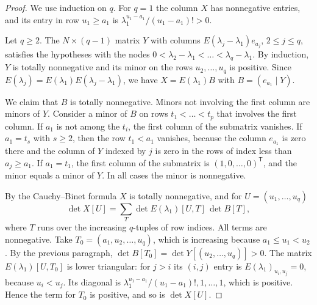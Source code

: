 \documentclass{amsart}
\theoremstyle{definition}
\numberwithin{equation}{section}
\begin{document}
\begin{proof}
We use induction on $q$. For $q=1$ the column $X$ has nonnegative entries, and
its entry in row $u_1\ge a_1$ is $\lambda_1^{u_1-a_1}/(u_1-a_1)!>0$.

Let $q\ge2$. The $N\times(q-1)$ matrix $Y$ with columns
$E(\lambda_j-\lambda_1)e_{a_j}$, $2\le j\le q$, satisfies the hypotheses with
the nodes $0<\lambda_2-\lambda_1<\dots<\lambda_q-\lambda_1$. By induction, $Y$
is totally nonnegative and its minor on the rows $u_2,\dots,u_q$ is positive.
Since $E(\lambda_j)=E(\lambda_1)E(\lambda_j-\lambda_1)$, we have $X=E(\lambda_1)B$
with $B=(e_{a_1}\mid Y)$.

We claim that $B$ is totally nonnegative. Minors not involving the first
column are minors of $Y$. Consider a minor of $B$ on rows $t_1<\dots<t_p$ that
involves the first column. If $a_1$ is not among the $t_i$, the first column of
the submatrix vanishes. If $a_1=t_s$ with $s\ge2$, then the row $t_1<a_1$
vanishes, because the column $e_{a_1}$ is zero there and the column of $Y$
indexed by $j$ is zero in the rows of index less than $a_j\ge a_1$. If $a_1=t_1$, the first column of the
submatrix is $(1,0,\dots,0)^{\mathsf T}$, and the minor equals a minor of $Y$.
In all cases the minor is nonnegative.

By the Cauchy--Binet formula $X$ is totally nonnegative, and for
$U=(u_1,\dots,u_q)$
\[
  \det X[U]=\sum_{T}\det E(\lambda_1)[U,T]\,\det B[T],
\]
where $T$ runs over the increasing $q$-tuples of row indices. All terms are
nonnegative. Take $T_0=(a_1,u_2,\dots,u_q)$, which is increasing because
$a_1\le u_1<u_2$. By the previous paragraph,
$\det B[T_0]=\det Y[(u_2,\dots,u_q)]>0$. The matrix $E(\lambda_1)[U,T_0]$ is
lower triangular: for $j>i$ its $(i,j)$ entry is $E(\lambda_1)_{u_i,u_j}=0$,
because $u_i<u_j$. Its diagonal is
$\lambda_1^{u_1-a_1}/(u_1-a_1)!,1,\dots,1$, which is positive. Hence the term
for $T_0$ is positive, and so is $\det X[U]$.
\end{proof}
\end{document}
